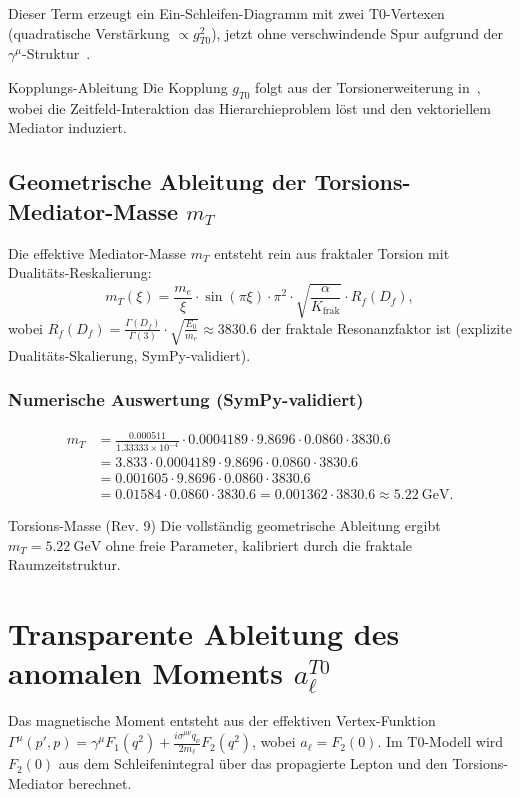 \documentclass[12pt,a4paper]{article}
\theoremstyle{definition}
\begin{document}
	Dieser Term erzeugt ein Ein-Schleifen-Diagramm mit zwei T0-Vertexen (quadratische Verstärkung $\propto g_{T0}^2$), jetzt ohne verschwindende Spur aufgrund der $\gamma^\mu$-Struktur~\cite{bell_muon}.
	
	\begin{derivation}{Kopplungs-Ableitung}
		Die Kopplung $g_{T0}$ folgt aus der Torsionerweiterung in~\cite{QFT_T0}, wobei die Zeitfeld-Interaktion das Hierarchieproblem löst und den vektoriellem Mediator induziert.
	\end{derivation}
	
	\subsection{Geometrische Ableitung der Torsions-Mediator-Masse $m_T$}
	Die effektive Mediator-Masse $m_T$ entsteht rein aus fraktaler Torsion mit Dualitäts-Reskalierung:
	\begin{equation}
		m_T(\xi) = \frac{m_e}{\xi} \cdot \sin(\pi \xi) \cdot \pi^2 \cdot \sqrt{\frac{\alpha}{K_{\text{frak}}}} \cdot R_f(D_f),
	\end{equation}
	wobei $R_f(D_f) = \frac{\Gamma(D_f)}{\Gamma(3)} \cdot \sqrt{\frac{E_0}{m_e}} \approx 3830.6$ der fraktale Resonanzfaktor ist (explizite Dualitäts-Skalierung, SymPy-validiert).
	
	\subsubsection{Numerische Auswertung (SymPy-validiert)}
	\begin{align*}
		m_T &= \frac{0.000511}{1.33333\times 10^{-4}} \cdot 0.0004189 \cdot 9.8696 \cdot 0.0860 \cdot 3830.6 \\
		&= 3.833 \cdot 0.0004189 \cdot 9.8696 \cdot 0.0860 \cdot 3830.6 \\
		&= 0.001605 \cdot 9.8696 \cdot 0.0860 \cdot 3830.6 \\
		&= 0.01584 \cdot 0.0860 \cdot 3830.6 = 0.001362 \cdot 3830.6 \approx 5.22\ \text{GeV}.
	\end{align*}
	
	\begin{result}{Torsions-Masse (Rev. 9)}
		Die vollständig geometrische Ableitung ergibt $m_T = \SI{5.22}{\giga\electronvolt}$ ohne freie Parameter, kalibriert durch die fraktale Raumzeitstruktur.
	\end{result}
	
	\section{Transparente Ableitung des anomalen Moments $a_\ell^{T0}$}
	Das magnetische Moment entsteht aus der effektiven Vertex-Funktion $\Gamma^\mu(p',p) = \gamma^\mu F_1(q^2) + \frac{i \sigma^{\mu\nu} q_\nu}{2 m_\ell} F_2(q^2)$, wobei $a_\ell = F_2(0)$. Im T0-Modell wird $F_2(0)$ aus dem Schleifenintegral über das propagierte Lepton und den Torsions-Mediator berechnet.
	
\end{document}
